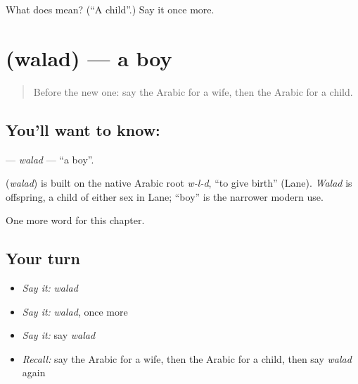 \begin{tcolorbox}[breakable,colback=teal!4,colframe=teal!35!black,title={Before you move on}]
What does  mean? (\textquotedblleft{}A child\textquotedblright{}.) Say it once more.
\end{tcolorbox}
\section[\texorpdfstring{\ar{ولد} (walad)}{ولد (walad)}]{ (walad) — a boy}

\label{lesson:AR-C56-walad}



\begin{quote}
Before the new one: say the Arabic for a wife, then the Arabic for a child.
\end{quote}

\subsection*{You'll want to know: }
\textbf{} — \emph{walad} — \textquotedblleft{}a boy\textquotedblright{}.

\begin{cousinweb}
\textbf{} (\emph{walad}) is built on the native Arabic root \emph{w-l-d}, \textquotedblleft{}to give birth\textquotedblright{} (Lane). \emph{Walad} is offspring, a child of either sex in Lane; \textquotedblleft{}boy\textquotedblright{} is the narrower modern use.
\end{cousinweb}

\begin{grammarlens}[title={What you've built}]
One more word for this chapter.
\end{grammarlens}

\subsection*{Your turn}
\begin{itemize}
\raggedright
  \item \emph{Say it:} \emph{walad}
  \item \emph{Say it:} \emph{walad}, once more
  \item \emph{Say it:} say \emph{walad}
  \item \emph{Recall:} say the Arabic for a wife, then the Arabic for a child, then say \emph{walad} again
\end{itemize}

